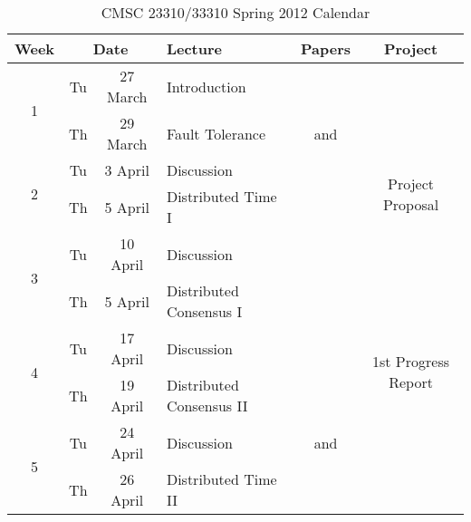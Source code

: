 \documentclass[11pt]{article}
\begin{document}
\begin{sidewaystable}
\sffamily
\setlength{\extrarowheight}{4pt}
\caption{CMSC 23310/33310 Spring 2012 Calendar}
\begin{tabular}{|c|cc||p{8cm}|c|c|}
\hline
\textbf{Week} &  \multicolumn{2}{|c||}{\textbf{Date}} & \textbf{Lecture} & \textbf{Papers} & \textbf{Project} \\\hline

\multirow{2}{*}{1}  & Tu & 27 March & Introduction                                       & \cellcolor[gray]{0.9} & \cellcolor[gray]{0.9}  \\\cline{2-5}
                    & Th & 29 March & Fault Tolerance                                    & \cite{Lamport:1985:SPU:858336.858339} and 
\cite{Dijkstra:1974:SSS:361179.361202} & \cellcolor[gray]{0.9}  \\\hline\hline

\multirow{2}{*}{2}  & Tu & 3 April & Discussion                                          & \cite{Lamport:1982:BGP:357172.357176} & \multirow{2}{*}{Project Proposal}  \\\cline{2-5}

                    & Th & 5 April & Distributed Time I                              & \cellcolor[gray]{0.9} & \\\hline\hline

\multirow{2}{*}{3}  & Tu & 10 April & Discussion                                         & \cite{Lamport:1978:TCO:359545.359563} & \cellcolor[gray]{0.9} \\\cline{2-5}
                    & Th & 5 April &  Distributed Consensus I                           & \cellcolor[gray]{0.9} & \cellcolor[gray]{0.9}  \\\hline\hline

\multirow{2}{*}{4}  & Tu & 17 April & Discussion                                         & \cite{Fischer:1985:IDC:3149.214121}  & \multirow{2}{*}{1st Progress Report}  \\\cline{2-5}
                    & Th & 19 April & Distributed Consensus II                           & \cellcolor[gray]{0.9} &   \\\hline\hline

\multirow{2}{*}{5}  & Tu & 24 April & Discussion                                         & \cite{Lamport:1998:PP:279227.279229} and \cite{lamport01paxos} & \cellcolor[gray]{0.9}  \\\cline{2-5}
                    & Th & 26 April & Distributed Time II                                & \cellcolor[gray]{0.9} & \cellcolor[gray]{0.9}  \\\hline\hline


\end{tabular}
\end{sidewaystable}
\end{document}
